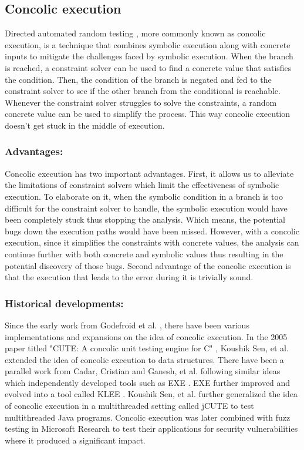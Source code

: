 \documentclass[ runningheads,
               a4paper]{llncs}
\begin{document}
\subsection{Concolic execution}
Directed automated random testing \cite[DART]{godefroid2005dart}, more commonly known as concolic execution, is a technique that combines symbolic execution along with concrete inputs to mitigate the challenges faced by symbolic execution. When the branch is reached, a constraint solver can be used to find a concrete value that satisfies the condition. Then, the condition of the branch is negated and fed to the constraint solver to see if the other branch from the conditional is reachable. Whenever the constraint solver struggles to solve the constraints, a random concrete value can be used to simplify the process. This way concolic execution doesn't get stuck in the middle of execution.


\subsubsection{Advantages:}
Concolic execution has two important advantages. First, it allows us to alleviate the limitations of constraint solvers which limit the effectiveness of symbolic execution. To elaborate on it, when the symbolic condition in a branch is too difficult for the constraint solver to handle, the symbolic execution would have been completely stuck thus stopping the analysis. Which means, the potential bugs down the execution paths would have been missed. However, with a concolic execution, since it simplifies the constraints with concrete values, the analysis can continue further with both concrete and symbolic values thus resulting in the potential discovery of those bugs. Second advantage of the concolic execution is that the execution that leads to the error during it is trivially sound.


\subsubsection{Historical developments:}
Since the early work from Godefroid et al. \cite{godefroid2005dart}, there have been various implementations and expansions on the idea of concolic execution. In the 2005 paper titled "CUTE: A concolic unit testing engine for C" \cite{sen2005cute}, Koushik Sen, et al. extended the idea of concolic execution to data structures. There have been a parallel work from Cadar, Cristian and Ganesh, et al. following similar ideas which independently developed tools such as EXE \cite{cadar2008exe}. EXE further improved and evolved into a tool called KLEE \cite{cadar2008klee}.  Koushik Sen, et al. further generalized the idea of concolic execution in a multithreaded setting called jCUTE \cite{sen2006cute} to test multithreaded Java programs. Concolic execution was later combined with fuzz testing in Microsoft Research \cite[SAGE]{godefroid2012sage} to test their applications for security vulnerabilities where it produced a significant impact.
\end{document}
